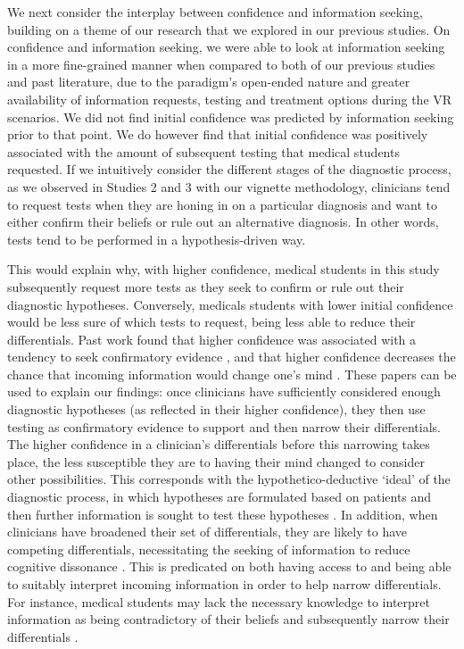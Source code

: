 \documentclass[a4paper, nobind]{templates/ociamthesis}
\begin{document}
We next consider the interplay between confidence and information seeking, building on a theme of our research that we explored in our previous studies. On confidence and information seeking, we were able to look at information seeking in a more fine-grained manner when compared to both of our previous studies and past literature, due to the paradigm's open-ended nature and greater availability of information requests, testing and treatment options during the VR scenarios. We did not find initial confidence was predicted by information seeking prior to that point. We do however find that initial confidence was positively associated with the amount of subsequent testing that medical students requested. If we intuitively consider the different stages of the diagnostic process, as we observed in Studies 2 and 3 with our vignette methodology, clinicians tend to request tests when they are honing in on a particular diagnosis and want to either confirm their beliefs or rule out an alternative diagnosis. In other words, tests tend to be performed in a hypothesis-driven way.

\hfill\break
This would explain why, with higher confidence, medical students in this study subsequently request more tests as they seek to confirm or rule out their diagnostic hypotheses. Conversely, medicals students with lower initial confidence would be less sure of which tests to request, being less able to reduce their differentials. Past work found that higher confidence was associated with a tendency to seek confirmatory evidence \autocite{rollwage_confidence_2020}, and that higher confidence decreases the chance that incoming information would change one's mind \autocite{pescetelli_confidence_2021}. These papers can be used to explain our findings: once clinicians have sufficiently considered enough diagnostic hypotheses (as reflected in their higher confidence), they then use testing as confirmatory evidence to support and then narrow their differentials. The higher confidence in a clinician's differentials before this narrowing takes place, the less susceptible they are to having their mind changed to consider other possibilities. This corresponds with the hypothetico-deductive `ideal' of the diagnostic process, in which hypotheses are formulated based on patients and then further information is sought to test these hypotheses \autocite{higgs_clinical_2019}. In addition, when clinicians have broadened their set of differentials, they are likely to have competing differentials, necessitating the seeking of information to reduce cognitive dissonance \autocite{adams_reduction_1961}. This is predicated on both having access to and being able to suitably interpret incoming information in order to help narrow differentials. For instance, medical students may lack the necessary knowledge to interpret information as being contradictory of their beliefs and subsequently narrow their differentials \autocite{arocha_novice_1995}.\\
\end{document}
